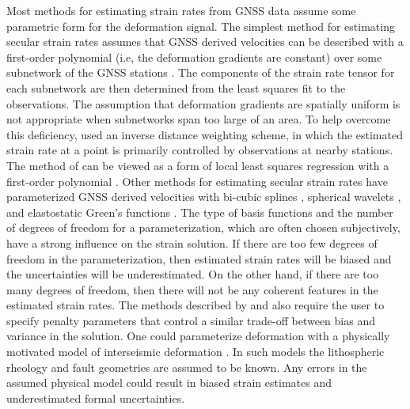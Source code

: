 \documentclass[extra,mreferee]{gji}
\begin{document}
Most methods for estimating strain rates from GNSS data assume some parametric form for the deformation signal. The simplest method for estimating secular strain rates assumes that GNSS derived velocities can be described with a first-order polynomial (i.e, the deformation gradients are constant) over some subnetwork of the GNSS stations \citep[e.g.,][]{Feigl1990,Murray2000}. The components of the strain rate tensor for each subnetwork are then determined from the least squares fit to the observations. The assumption that deformation gradients are spatially uniform is not appropriate when subnetworks span too large of an area. To help overcome this deficiency, \citet{Shen1996,Shen2015} used an inverse distance weighting scheme, in which the estimated strain rate at a point is primarily controlled by observations at nearby stations. The method  of \citet{Shen1996,Shen2015} can be viewed as a form of local least squares regression with a first-order polynomial \citep[e.g.,][sec. 6]{Hastie2009}. Other methods for estimating secular strain rates have parameterized GNSS derived velocities with bi-cubic splines \citep{Beavan2001}, spherical wavelets \citep{Tape2009}, and elastostatic Green's functions \citep{Sandwell2016}. The type of basis functions and the number of degrees of freedom for a parameterization, which are often chosen subjectively, have a strong influence on the strain solution. If there are too few degrees of freedom in the parameterization, then estimated strain rates will be biased and the uncertainties will be underestimated. On the other hand, if there are too many degrees of freedom, then there will not be any coherent features in the estimated strain rates. The methods described by \citet{Beavan2001} and \citet{Tape2009} also require the user to specify penalty parameters that control a similar trade-off between bias and variance in the solution. One could parameterize deformation with a physically motivated model of interseismic deformation \citep[e.g.,][]{Meade2005,McCaffrey2007}. In such models the lithospheric rheology and fault geometries are assumed to be known. Any errors in the assumed physical model could result in biased strain estimates and underestimated formal uncertainties. 
\end{document}
